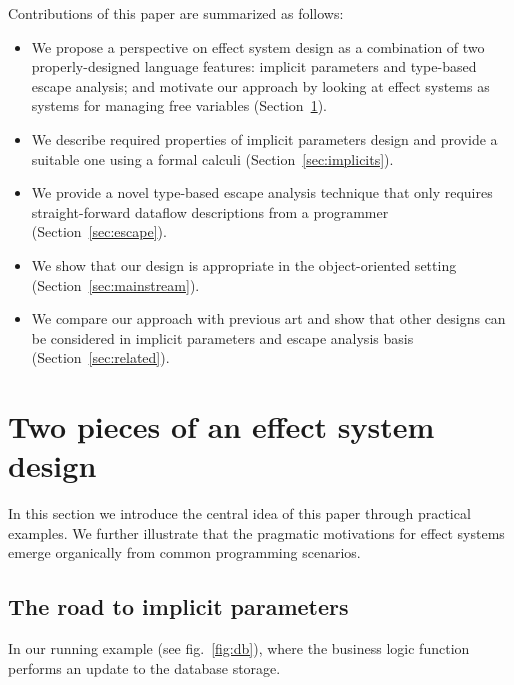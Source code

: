 \documentclass[acmsmall]{acmart}
\begin{document}

Contributions of this paper are summarized as follows:

\begin{itemize} %
    \item We propose a perspective on effect system design as a combination of two properly-designed language features: implicit parameters and type-based escape analysis; and motivate our approach by looking at effect systems as systems for managing free variables (Section~\ref{sec:idea}).
    \item We describe required properties of implicit parameters design and provide a suitable one using a formal calculi (Section~\ref{sec:implicits}).
    \item We provide a novel type-based escape analysis technique that only requires straight-forward dataflow descriptions from a programmer (Section~\ref{sec:escape}).
    \item We show that our design is appropriate in the object-oriented setting (Section~\ref{sec:mainstream}). %
    \item We compare our approach with previous art and show that other designs can be considered in implicit parameters and escape analysis basis (Section~\ref{sec:related}).
\end{itemize}


\section{Two pieces of an effect system design} \label{sec:idea}

In this section we introduce the central idea of this paper through practical examples.
We further illustrate that the pragmatic motivations for effect systems emerge organically from common programming scenarios.

\subsection{The road to implicit parameters} \label{subsec:implicits}

In our running example (see fig.\ \ref{fig:db}), where the business logic function performs an update to the database storage.
\end{document}
